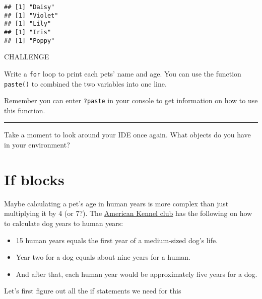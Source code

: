 \documentclass[]{book}
\newenvironment{Shaded}{\begin{snugshade}}{\end{snugshade}}
\newcommand{\ControlFlowTok}[1]{\textcolor[rgb]{0.13,0.29,0.53}{\textbf{#1}}}
\newcommand{\DecValTok}[1]{\textcolor[rgb]{0.00,0.00,0.81}{#1}}
\newcommand{\KeywordTok}[1]{\textcolor[rgb]{0.13,0.29,0.53}{\textbf{#1}}}
\newcommand{\NormalTok}[1]{#1}
\newcommand{\OperatorTok}[1]{\textcolor[rgb]{0.81,0.36,0.00}{\textbf{#1}}}
\providecommand{\tightlist}{%
  \setlength{\itemsep}{0pt}\setlength{\parskip}{0pt}}
\begin{document}
\begin{Shaded}
\end{Shaded}

\begin{verbatim}
## [1] "Daisy"
## [1] "Violet"
## [1] "Lily"
## [1] "Iris"
## [1] "Poppy"
\end{verbatim}

\leavevmode\hypertarget{challenge}{}%
CHALLENGE

Write a \texttt{for} loop to print each pets' name and age. You can use the function \texttt{paste()} to combined the two variables into one line.

Remember you can enter \texttt{?paste} in your console to get information on how to use this function.

\begin{center}\rule{0.5\linewidth}{0.5pt}\end{center}

\leavevmode\hypertarget{question}{}%
Take a moment to look around your IDE once again. What objects do you have in your environment?

\hypertarget{if-blocks}{%
\section{If blocks}\label{if-blocks}}

Maybe calculating a pet's age in human years is more complex than just multiplying it by 4 (or 7?). The \href{https://www.akc.org/expert-advice/health/how-to-calculate-dog-years-to-human-years/}{American Kennel club} has the following on how to calculate dog years to human years:

\begin{itemize}
\tightlist
\item
  15 human years equals the first year of a medium-sized dog's life.
\item
  Year two for a dog equals about nine years for a human.
\item
  And after that, each human year would be approximately five years for a dog.
\end{itemize}

Let's first figure out all the if statements we need for this
\end{document}
